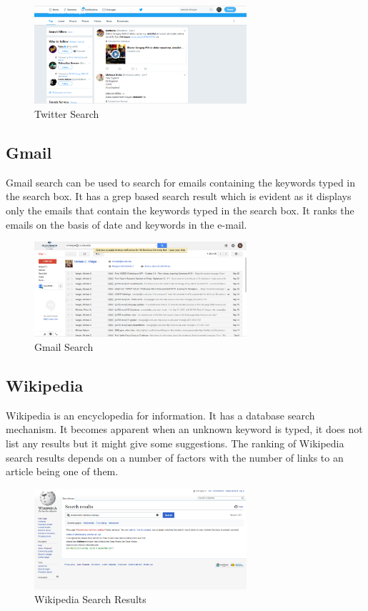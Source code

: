 \documentclass[12pt]{report}
\begin{document}
\begin{figure}[ht]
  \centering
  \includegraphics[width=0.7\textwidth,]{TwitterSearch.PNG}
  \caption{Twitter Search }
  \label{fig:9}
\end{figure}

\subsection{Gmail}
Gmail search can be used to search for emails containing the keywords typed in the search box. It has a grep based search result which is evident as it displays only the emails that contain the keywords typed in the search box. It ranks the emails on the basis of date and keywords in the e-mail. 

\begin{figure}[ht]
  \centering
  \includegraphics[width=0.7\textwidth,]{GmailSearch.PNG}
  \caption{Gmail Search }
  \label{fig:10}
\end{figure}

\subsection{Wikipedia}
Wikipedia is an encyclopedia for information. \cite{7} It has a database search mechanism. It becomes apparent when an unknown keyword is typed, it does not list any results but it might give some suggestions. The ranking of Wikipedia search results depends on a number of factors with the number of links to an article being one of them. \cite{8}

\begin{figure}[ht]
  \centering
  \includegraphics[width=0.7\textwidth,]{Wikipedia_Search.PNG}
  \caption{Wikipedia Search Results}
  \label{fig:11}
\end{figure}
\end{document}
